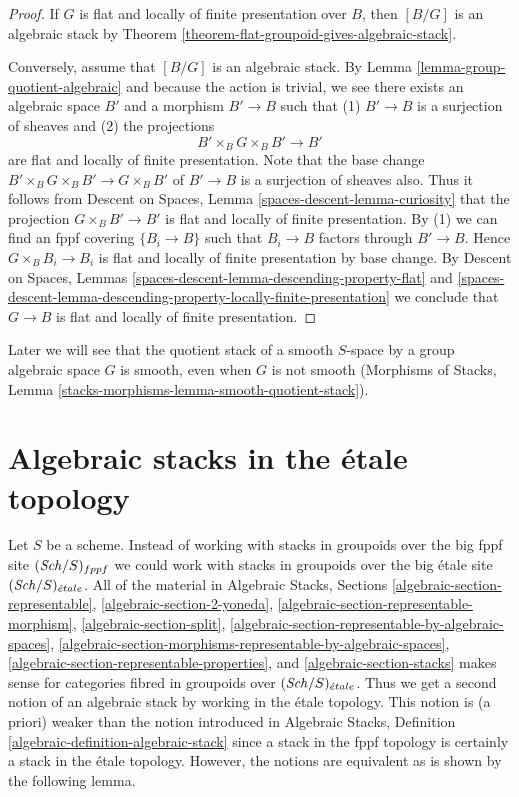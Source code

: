 \begin{proof}
If $G$ is flat and locally of finite presentation over $B$, then
$[B/G]$ is an algebraic stack by
Theorem \ref{theorem-flat-groupoid-gives-algebraic-stack}.

\medskip\noindent
Conversely, assume that $[B/G]$ is an algebraic stack. By
Lemma \ref{lemma-group-quotient-algebraic}
and because the action is trivial, we see
there exists an algebraic space $B'$ and a morphism
$B' \to B$ such that (1) $B' \to B$ is a surjection
of sheaves and (2) the projections
$$
B' \times_B G \times_B B' \to B'
$$
are flat and locally of finite presentation. Note that the base change
$B' \times_B G \times_B B' \to G \times_B B'$ of $B' \to B$
is a surjection of sheaves also. Thus it follows from
Descent on Spaces, Lemma \ref{spaces-descent-lemma-curiosity}
that the projection $G \times_B B' \to B'$ is flat and locally
of finite presentation. By (1) we can find an fppf covering
$\{B_i \to B\}$ such that $B_i \to B$ factors through $B' \to B$.
Hence $G \times_B B_i \to B_i$ is flat and locally of finite presentation
by base change. By
Descent on Spaces, Lemmas
\ref{spaces-descent-lemma-descending-property-flat} and
\ref{spaces-descent-lemma-descending-property-locally-finite-presentation}
we conclude that $G \to B$ is flat and locally of finite presentation.
\end{proof}

\noindent
Later we will see that the quotient stack of a smooth $S$-space
by a group algebraic space $G$ is smooth, even when $G$ is not smooth
(Morphisms of Stacks, Lemma
\ref{stacks-morphisms-lemma-smooth-quotient-stack}).




\section{Algebraic stacks in the \'etale topology}
\label{section-stacks-etale}

\noindent
Let $S$ be a scheme. Instead of working with stacks in groupoids over
the big fppf site $(\mathit{Sch}/S)_{fppf}$ we could work with stacks in groupoids
over the big \'etale site $(\mathit{Sch}/S)_{\acute{e}tale}$. All of the material in
Algebraic Stacks, Sections
\ref{algebraic-section-representable},
\ref{algebraic-section-2-yoneda},
\ref{algebraic-section-representable-morphism},
\ref{algebraic-section-split},
\ref{algebraic-section-representable-by-algebraic-spaces},
\ref{algebraic-section-morphisms-representable-by-algebraic-spaces},
\ref{algebraic-section-representable-properties}, and
\ref{algebraic-section-stacks}
makes sense for categories fibred in groupoids over $(\mathit{Sch}/S)_{\acute{e}tale}$.
Thus we get a second notion of an algebraic stack by working in the
\'etale topology. This notion is (a priori) weaker than the notion introduced
in Algebraic Stacks, Definition \ref{algebraic-definition-algebraic-stack}
since a stack in the fppf topology is certainly a stack in the \'etale
topology. However, the notions are equivalent as is shown by the following
lemma.

